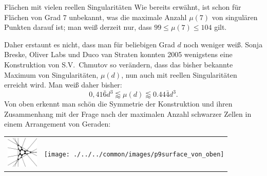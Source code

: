 \begin{surferPage}[216 Singularitäten]{Flächen mit vielen reellen Singularitäten}
  Wie bereits erwähnt, ist schon für Flächen von Grad $7$ unbekannt, was die
    maximale Anzahl $\mu(7)$ von singulären Punkten darauf ist; man weiß derzeit
    nur, dass $99\le \mu(7) \le 104$ gilt. 

    Daher erstaunt es nicht, dass man für beliebigen Grad $d$ noch weniger
    weiß.
    Sonja Breske, Oliver Labs und Duco van Straten konnten 2005 wenigstens eine
    Konstruktion von S.V.\ Chmutov so verändern, dass das bisher bekannte
    Maximum von Singularitäten, $\mu(d)$, nun auch mit reellen Singularitäten 
    erreicht wird.
    Man weiß daher bisher: 
    \[0,41\bar{6}d^3 \lessapprox \mu(d) \lessapprox 0.44\bar{4} d^3.\]
    Von oben erkennt man schön die Symmetrie der Konstruktion
    und ihren Zusammenhang mit der Frage nach der maximalen Anzahl schwarzer
    Zellen in einem Arrangement von Geraden:
    \begin{center}
      \begin{tabular}{c@{\qquad}c}
        \includegraphics[height=1.5cm]{./../../common/images/vielesing.pdf}
        &
        \texttt{[image: ./../../common/images/p9surface\_von\_oben]}
      \end{tabular}
    \end{center}
\end{surferPage}
